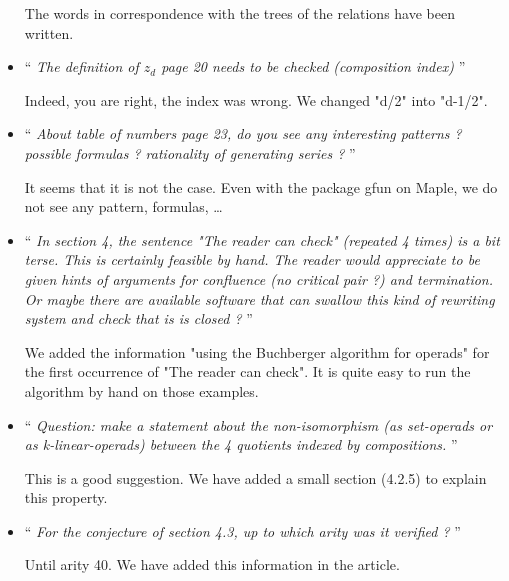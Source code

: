 \documentclass[11pt,reqno]{amsart}
\numberwithin{equation}{subsection}
\begin{document}
\begin{itemize}
The words in correspondence with the trees of the relations have been
written.
\medbreak

\item `` {\it
The definition of $z_d$ page 20 needs to be checked (composition index)
}''
\smallbreak

Indeed, you are right, the index was wrong. We changed "d/2" into
"d-1/2".
\medbreak

\item `` {\it
About table of numbers page 23, do you see any interesting patterns ?
possible formulas ? rationality of generating series ?
}''
\smallbreak

It seems that it is not the case. Even with the package gfun on
Maple, we do not see any pattern, formulas, \dots
\medbreak

\item `` {\it
In section 4, the sentence "The reader can check" (repeated 4 times)
is a bit terse. This is certainly feasible by hand. The reader would
appreciate to be given hints of arguments for confluence (no critical
pair ?) and termination. Or maybe there are available software that
can swallow this kind of rewriting system and check that is is closed ?
}''
\smallbreak

We added the information "using the Buchberger algorithm for operads" for 
the first occurrence of "The reader can check". It is quite easy to run 
the algorithm by hand on those examples.
\medbreak

\item `` {\it
Question: make a statement about the non-isomorphism (as set-operads
or as k-linear-operads) between the 4 quotients indexed by compositions.
}''
\smallbreak

This is a good suggestion. We have added a small section (4.2.5) to
explain this property.
\medbreak

\item `` {\it
For the conjecture of section 4.3, up to which arity was it verified ?
}''
\smallbreak

Until arity 40. We have added this information in the article.
\medbreak

\end{itemize}
\end{document}
